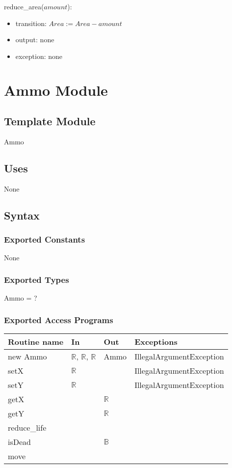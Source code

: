 \documentclass[12pt]{article}
\begin{document}
\noindent reduce\_area($\mathit{amount}$):
\begin{itemize}
\item transition: $Area := Area - amount$ 
\item output: none
\item exception: none
\end{itemize}
\newpage

\section{Ammo Module}

\subsection*{Template Module}
Ammo

\subsection*{Uses}
None

\subsection*{Syntax}
\subsubsection*{Exported Constants}
None
\subsubsection*{Exported Types}
Ammo = ?
\subsubsection*{Exported Access Programs}
\begin{tabular}{| l | l | l | p{5cm} |}
\hline
\textbf{Routine name} & \textbf{In} & \textbf{Out} & \textbf{Exceptions}\\
\hline
new Ammo & $\mathbb{R}$, $\mathbb{R}$, $\mathbb{R}$ & Ammo & IllegalArgumentException\\
\hline
setX & $\mathbb{R}$ &  & IllegalArgumentException\\
\hline
setY & $\mathbb{R}$ &  & IllegalArgumentException\\
\hline
getX &    & $\mathbb{R}$ & \\
\hline
getY &    & $\mathbb{R}$ & \\
\hline
reduce\_life & & & \\
\hline
isDead & & $\mathbb{B}$ & \\
\hline
move & & &\\
\hline
\end{tabular}
\end{document}
